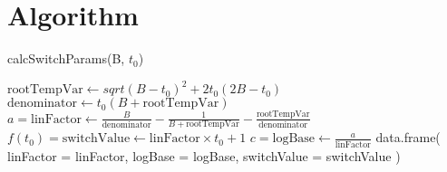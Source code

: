 \documentclass[11pt, a4paper]{article}
\begin{document}
    \section{Algorithm}
    \begin{algorithm}
        \caption{calcSwitchParams(B, \(t_0\))}
        \begin{algorithmic}[1]
            \State \(\text{rootTempVar} \gets sqrt{(B-t_0)^2 + 2 t_0(2B - t_0)}\)
            \State \(\text{denominator} \gets  t_0(B + \text{rootTempVar})\)
            \State
            \State \(a = \text{linFactor} 
            \gets \frac{B}{\text{denominator}} - \frac{1}{B + \text{rootTempVar}} - \frac{\text{rootTempVar}}{\text{denominator}}\)
            \State \(f(t_0) = \text{switchValue}  \gets \text{linFactor}\times t_0 +1\)
            \State \(c = \text{logBase}  \gets \frac{a}{\text{linFactor}}\)
            \State 
            \State \Return data.frame(
            \State    linFactor = linFactor, logBase = logBase, switchValue = switchValue
            \State )
        \end{algorithmic}
    \end{algorithm}
\end{document}
